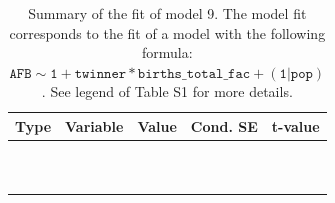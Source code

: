 \begin{table}

\caption{\label{tab:tab9}Summary of the fit of model 9. The model fit corresponds to the fit of a model with the following formula: {\small$\mathtt{AFB \sim 1 + twinner * births\_total\_fac + (1 | pop)}$}. See legend of Table S1 for more details.}
\centering
\fontsize{8}{10}\selectfont
\begin{tabular}[t]{>{\raggedright\arraybackslash}p{3cm}>{\raggedright\arraybackslash}p{5cm}rrr}
\toprule
Type & Variable & Value & Cond. SE & t-value\\
\midrule
\cellcolor{gray!6}{fixed effects} & \cellcolor{gray!6}{$\beta_1$} & \cellcolor{gray!6}{5.86} & \cellcolor{gray!6}{0.0123} & \cellcolor{gray!6}{479}\\
\cellcolor{gray!6}{} & \cellcolor{gray!6}{$\beta_{\mathtt{twinner}}$} & \cellcolor{gray!6}{0.0752} & \cellcolor{gray!6}{0.0207} & \cellcolor{gray!6}{3.63}\\
\cellcolor{gray!6}{} & \cellcolor{gray!6}{$\beta_{\mathtt{births\_total\_fac2}}$} & \cellcolor{gray!6}{-0.0396} & \cellcolor{gray!6}{0.00461} & \cellcolor{gray!6}{-8.6}\\
\cellcolor{gray!6}{} & \cellcolor{gray!6}{$\beta_{\mathtt{births\_total\_fac3}}$} & \cellcolor{gray!6}{-0.0686} & \cellcolor{gray!6}{0.00462} & \cellcolor{gray!6}{-14.8}\\
\cellcolor{gray!6}{} & \cellcolor{gray!6}{$\beta_{\mathtt{births\_total\_fac4}}$} & \cellcolor{gray!6}{-0.0977} & \cellcolor{gray!6}{0.00465} & \cellcolor{gray!6}{-21}\\
\cellcolor{gray!6}{} & \cellcolor{gray!6}{$\beta_{\mathtt{births\_total\_fac5}}$} & \cellcolor{gray!6}{-0.122} & \cellcolor{gray!6}{0.00477} & \cellcolor{gray!6}{-25.6}\\
\cellcolor{gray!6}{} & \cellcolor{gray!6}{$\beta_{\mathtt{births\_total\_fac6}}$} & \cellcolor{gray!6}{-0.156} & \cellcolor{gray!6}{0.00486} & \cellcolor{gray!6}{-32.1}\\
\cellcolor{gray!6}{} & \cellcolor{gray!6}{$\beta_{\mathtt{births\_total\_fac7}}$} & \cellcolor{gray!6}{-0.182} & \cellcolor{gray!6}{0.00513} & \cellcolor{gray!6}{-35.5}\\
\cellcolor{gray!6}{} & \cellcolor{gray!6}{$\beta_{\mathtt{births\_total\_fac8}}$} & \cellcolor{gray!6}{-0.217} & \cellcolor{gray!6}{0.00536} & \cellcolor{gray!6}{-40.5}\\
\cellcolor{gray!6}{} & \cellcolor{gray!6}{$\beta_{\mathtt{births\_total\_fac9}}$} & \cellcolor{gray!6}{-0.244} & \cellcolor{gray!6}{0.00601} & \cellcolor{gray!6}{-40.7}\\

\end{tabular}
\end{table}
